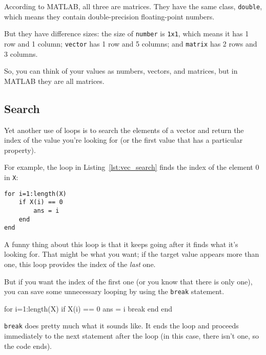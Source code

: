 According to MATLAB, all three are matrices.  They have the same class, {\tt double}, which
means they contain double-precision floating-point numbers.


But they have difference sizes: the size of {\tt number} is {\tt 1x1}, which means it has 1 row and 1 column; {\tt vector} has 1 row and 5 columns; and {\tt matrix} has 2 rows and 3 columns.

So, you can think of your values as
numbers, vectors, and matrices, but in MATLAB they are all matrices.



\subsection{Search}
\label{search}

Yet another use of loops is to search the elements of a vector
and return the index of the value you're looking for (or the
first value that has a particular property).  


For example, the loop in Listing~\ref{lst:vec_search} finds the index of the element 0 in 
{\tt X}:

\begin{lstlisting}[caption={Searching for the last appearance of 0 in a vector)}, label={lst:vec_search}]
for i=1:length(X)
    if X(i) == 0
        ans = i
    end
end
\end{lstlisting}

A funny thing about this loop is that it keeps going after it
finds what it's looking for.  That might be what you want; if the
target value appears more than one, this loop provides the index
of the {\em last} one.


But if you want the index of the first one (or you know that there
is only one), you can save some unnecessary looping by using the
{\tt break} statement.

\begin{code}
for i=1:length(X)
    if X(i) == 0
        ans = i
        break
    end
end
\end{code}

{\tt break} does pretty much what it sounds like.  It ends the
loop and proceeds immediately to the next statement after the
loop (in this case, there isn't one, so the code ends).